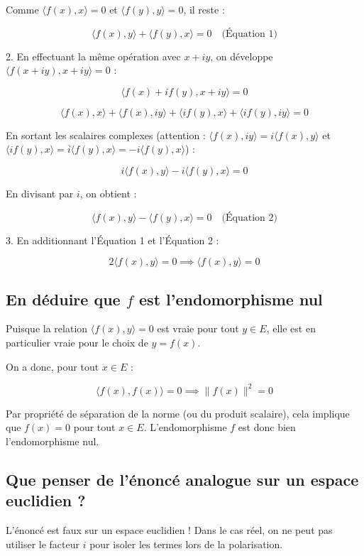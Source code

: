 \documentclass[french]{yLectureNote}
\begin{document}
Comme $\langle f(x), x \rangle = 0$ et $\langle f(y), y \rangle = 0$, il reste :

$$\langle f(x), y \rangle + \langle f(y), x \rangle = 0 \quad \text{(Équation 1)}$$


2. En effectuant la même opération avec $x+iy$, on développe $\langle f(x+iy), x+iy \rangle = 0$ :

$$\langle f(x) + i f(y), x+iy \rangle = 0$$


$$\langle f(x), x \rangle + \langle f(x), iy \rangle + \langle if(y), x \rangle + \langle if(y), iy \rangle = 0$$



En sortant les scalaires complexes (attention : $\langle f(x), iy \rangle = i\langle f(x), y \rangle$ et $\langle if(y), x \rangle = \overline{i}\langle f(y), x \rangle = -i\langle f(y), x \rangle$) :

$$i\langle f(x), y \rangle - i\langle f(y), x \rangle = 0$$



En divisant par $i$, on obtient :

$$\langle f(x), y \rangle - \langle f(y), x \rangle = 0 \quad \text{(Équation 2)}$$


3. En additionnant l'Équation 1 et l'Équation 2 :

$$2\langle f(x), y \rangle = 0 \implies \langle f(x), y \rangle = 0$$



\subsection{En déduire que $f$ est l'endomorphisme nul}

Puisque la relation $\langle f(x), y \rangle = 0$ est vraie pour tout $y \in E$, elle est en particulier vraie pour le choix de $y = f(x)$.

On a donc, pour tout $x \in E$ :


$$\langle f(x), f(x) \rangle = 0 \implies \|f(x)\|^2 = 0$$

Par propriété de séparation de la norme (ou du produit scalaire), cela implique que $f(x) = 0$ pour tout $x \in E$. L'endomorphisme $f$ est donc bien l'endomorphisme nul.

\subsection{Que penser de l'énoncé analogue sur un espace euclidien ?}


L'énoncé est faux sur un espace euclidien ! Dans le cas réel, on ne peut pas utiliser le facteur $i$ pour isoler les termes lors de la polarisation.
\end{document}

